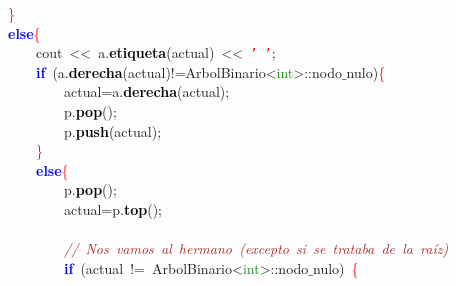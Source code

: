\mbox{}\ \ \ \ \ \ \ \ \textcolor{Red}{\}} \\
\mbox{}\ \ \ \ \ \ \ \ \textbf{\textcolor{Blue}{else}}\textcolor{Red}{\{} \\
\mbox{}\ \ \ \ \ \ \ \ \ \ \ \ cout\ \textcolor{BrickRed}{\textless{}\textless{}}\ a\textcolor{BrickRed}{.}\textbf{\textcolor{Black}{etiqueta}}\textcolor{BrickRed}{(}actual\textcolor{BrickRed}{)}\ \textcolor{BrickRed}{\textless{}\textless{}}\ \texttt{\textcolor{Red}{'\ '}}\textcolor{BrickRed}{;} \\
\mbox{}\ \ \ \ \ \ \ \ \ \ \ \ \textbf{\textcolor{Blue}{if}}\ \textcolor{BrickRed}{(}a\textcolor{BrickRed}{.}\textbf{\textcolor{Black}{derecha}}\textcolor{BrickRed}{(}actual\textcolor{BrickRed}{)!=}ArbolBinario\textcolor{BrickRed}{\textless{}}\textcolor{ForestGreen}{int}\textcolor{BrickRed}{\textgreater{}::}nodo$\_$nulo\textcolor{BrickRed}{)}\textcolor{Red}{\{} \\
\mbox{}\ \ \ \ \ \ \ \ \ \ \ \ \ \ \ \ actual\textcolor{BrickRed}{=}a\textcolor{BrickRed}{.}\textbf{\textcolor{Black}{derecha}}\textcolor{BrickRed}{(}actual\textcolor{BrickRed}{);} \\
\mbox{}\ \ \ \ \ \ \ \ \ \ \ \ \ \ \ \ p\textcolor{BrickRed}{.}\textbf{\textcolor{Black}{pop}}\textcolor{BrickRed}{();} \\
\mbox{}\ \ \ \ \ \ \ \ \ \ \ \ \ \ \ \ p\textcolor{BrickRed}{.}\textbf{\textcolor{Black}{push}}\textcolor{BrickRed}{(}actual\textcolor{BrickRed}{);} \\
\mbox{}\ \ \ \ \ \ \ \ \ \ \ \ \textcolor{Red}{\}} \\
\mbox{}\ \ \ \ \ \ \ \ \ \ \ \ \textbf{\textcolor{Blue}{else}}\textcolor{Red}{\{} \\
\mbox{}\ \ \ \ \ \ \ \ \ \ \ \ \ \ \ \ p\textcolor{BrickRed}{.}\textbf{\textcolor{Black}{pop}}\textcolor{BrickRed}{();} \\
\mbox{}\ \ \ \ \ \ \ \ \ \ \ \ \ \ \ \ actual\textcolor{BrickRed}{=}p\textcolor{BrickRed}{.}\textbf{\textcolor{Black}{top}}\textcolor{BrickRed}{();} \\
\mbox{} \\
\mbox{}\ \ \ \ \ \ \ \ \ \ \ \ \ \ \ \ \textit{\textcolor{Brown}{//\ Nos\ vamos\ al\ hermano\ (excepto\ si\ se\ trataba\ de\ la\ raíz)}} \\
\mbox{}\ \ \ \ \ \ \ \ \ \ \ \ \ \ \ \ \textbf{\textcolor{Blue}{if}}\ \textcolor{BrickRed}{(}actual\ \textcolor{BrickRed}{!=}\ ArbolBinario\textcolor{BrickRed}{\textless{}}\textcolor{ForestGreen}{int}\textcolor{BrickRed}{\textgreater{}::}nodo$\_$nulo\textcolor{BrickRed}{)}\ \textcolor{Red}{\{} \\

